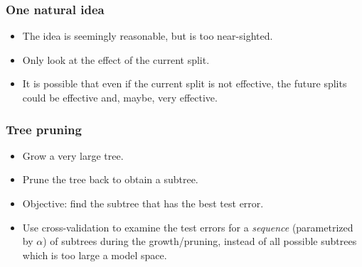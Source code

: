 \documentclass{beamer}
\begin{document}
     \begin{frame}
     	\frametitle{ One natural idea}
     	\begin{itemize}	
     		\item  The idea is seemingly reasonable, but is too near-sighted. 
     	 
     		\item  Only look at the effect of the current split.
     		\item It is possible that even if the current split is not effective, the future splits
     		could be effective and, maybe, very effective.
     	 
     	\end{itemize}
     \end{frame} 
     
      \begin{frame}
      	\frametitle{Tree pruning}
      	\begin{itemize}	
      		\item  Grow a very large tree. 
      		\item Prune the tree back to obtain a subtree.
      		\item Objective: find the subtree that has the best test error.
      		\item Use cross-validation to examine the test errors for a \emph{sequence} (parametrized by $\alpha$) of subtrees during the growth/pruning, instead of all possible subtrees which is too large a model space. 
      	\end{itemize}
      \end{frame} 
      
\end{document}
